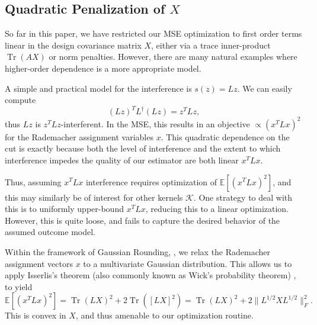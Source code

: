 \documentclass[12pt]{article}
\theoremstyle{definition}
\numberwithin{equation}{section}
\numberwithin{figure}{section}
\newcommand{\calK}{{\mathcal K}}
\numberwithin{equation}{section}
\numberwithin{figure}{section}
\begin{document}
\subsection{Quadratic Penalization of $X$}

So far in this paper, we have restricted our MSE optimization to first order terms linear in the design covariance matrix $X$, either via a trace inner-product $\operatorname{Tr}(AX)$ or norm penalties. However, there are many natural examples where higher-order dependence is a more appropriate model. 

\begin{example}
    A simple and practical model for the interference is $s(z) = Lz$. We can easily compute
    \[
    (Lz)^T L^\dagger (Lz) = z^T L z,
    \]
    thus $Lz$ is $z^T L z$-interferent. In the MSE, this results in an objective $\propto (x^T L x)^2$ for the Rademacher assignment variables $x$. This quadratic dependence on the cut is exactly because both the level of interference and the extent to which interference impedes the quality of our estimator are both linear $x^T L x$.
\end{example}

Thus, assuming $x^T L x$ interference requires optimization of $\mathbb{E}[(x^T L x)^2]$, and this may similarly be of interest for other kernels $\calK$. One strategy to deal with this is to uniformly upper-bound $x^T L x$, reducing this to a linear optimization. However, this is quite loose, and fails to capture the desired behavior of the assumed outcome model.

Within the framework of Gaussian Rounding, , we relax the Rademacher assignment vectors $x$ to a multivariate Gaussian distribution. This allows us to apply Isserlis's theorem (also commonly known as Wick's probability theorem) \citep{342f2b77-510b-3d97-9992-746cb8a2d27e}, to yield
\[
\mathbb{E}[(x^T L x)^2] = \operatorname{Tr}(LX)^2 + 2 \operatorname{Tr}([LX]^2) = \operatorname{Tr}(LX)^2 + 2 \|L^{1/2}XL^{1/2}\|_F^2.
\]
This is convex in $X$, and thus amenable to our optimization routine.
\end{document}
